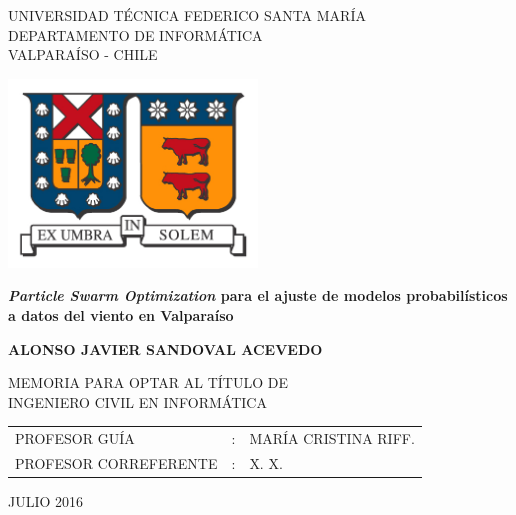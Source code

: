 
\begin{center}
  \begin{spacing}{1}
    {\large UNIVERSIDAD TÉCNICA FEDERICO SANTA MARÍA}\\
    DEPARTAMENTO DE INFORMÁTICA\\
    VALPARAÍSO - CHILE
  \end{spacing}

  \vspace{12mm}
  \includegraphics[height=50mm]{figures/usm_logo.png}
  \vspace{15mm}

  \begin{spacing}{1.5} 
    \textbf{\large \emph{Particle Swarm Optimization} para el ajuste de modelos
      probabilísticos a datos del viento en Valparaíso}\\
  \end{spacing}

  \vspace{20mm}
  \textbf{\large ALONSO JAVIER SANDOVAL ACEVEDO}
  \vspace{12mm}

  \begin{spacing}{1.25} 
    MEMORIA PARA OPTAR AL TÍTULO DE\\
    INGENIERO CIVIL EN INFORMÁTICA
  \end{spacing}

  \vspace{15mm}
  \begin{table}[h]
    \begin{center}
      \begin{tabular}{ l c l }
        PROFESOR GUÍA & : & MARÍA CRISTINA RIFF.\\
        PROFESOR CORREFERENTE & : & X. X.\\
      \end{tabular}
    \end{center}
  \end{table}

  \vfill
  \large JULIO 2016
\end{center}
